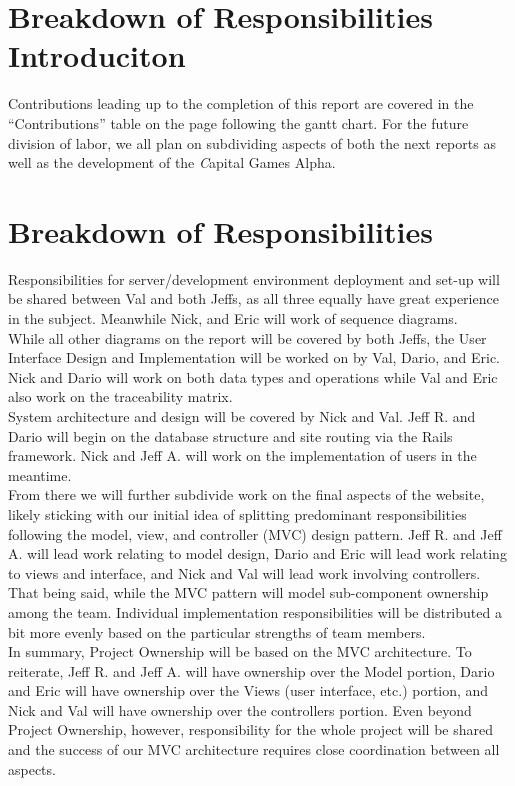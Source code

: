\section{Breakdown of Responsibilities Introduciton}

Contributions leading up to the completion of this report are covered in the 
``Contributions'' table on the page following the gantt chart. For the future
division of labor, we all plan on subdividing aspects of both the next reports 
as well as the development of the {\textit Capital Games} Alpha. 

\section{Breakdown of Responsibilities}

Responsibilities for server/development environment deployment and set-up will be shared between Val and both Jeffs, as all three equally have great experience in the subject. Meanwhile Nick, and Eric will work of sequence diagrams. \\

While all other diagrams on the report will be covered by both Jeffs, the User Interface Design and Implementation will be worked on by Val, Dario, and Eric. Nick and Dario will work on both data types and operations while Val and Eric also work on the traceability matrix. \\

System architecture and design will be covered by Nick and Val. Jeff R. and Dario will begin on the database structure and site routing via the Rails framework. Nick and Jeff A. will work on the implementation of users in the meantime. \\

From there we will further subdivide work on the final aspects of the website, likely sticking with our initial idea of splitting predominant responsibilities following the model, view, and controller (MVC) design pattern. Jeff R. and Jeff A. will lead work relating to model design, Dario and Eric will lead work relating to views and interface, and Nick and Val will lead work involving controllers. That being said, while the MVC pattern will model sub-component ownership among the team. Individual implementation responsibilities will be distributed a bit more evenly based on the particular strengths of team members. \\

In summary, Project Ownership will be based on the MVC architecture. To reiterate, Jeff R. and Jeff A. will have ownership over the Model portion, Dario and Eric will have ownership over the Views (user interface, etc.) portion, and Nick and Val will have ownership over the controllers portion. Even beyond Project Ownership, however, responsibility for the whole project will be shared and the success of our MVC architecture requires close coordination between all aspects. \\

